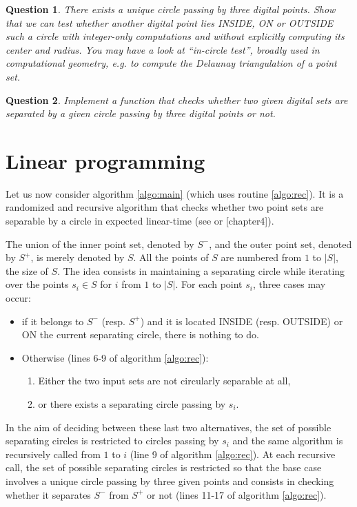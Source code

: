 \documentclass[a4paper, 11pt]{article}
\newtheorem{qu}{Question}
\begin{document}
\begin{qu}
There exists a unique circle passing by three digital points. Show that we can test whether another digital
point lies INSIDE, ON or OUTSIDE such a circle with integer-only computations and without explicitly computing 
its center and radius. You may have a look at ``in-circle test'', broadly used in computational geometry, e.g. 
to compute the Delaunay triangulation of a point set.  
\end{qu}

\begin{qu}
Implement a function that checks whether two given digital sets are separated by a given circle passing by three
digital points or not.  
\end{qu}

\section{Linear programming}

Let us now consider algorithm \ref{algo:main} (which uses routine \ref{algo:rec}). 
It is a randomized and recursive algorithm that checks whether two point sets
 are separable by a circle in expected linear-time (see \cite{Seidel1991} or \cite{Berg2000}[chapter4]). 

The union of the inner point set, denoted by $S^-$, and the outer point set, denoted by $S^+$, is 
merely denoted by $S$. All the points of $S$ are numbered from $1$ to $|S|$, the size of $S$.    
The idea consists in maintaining a separating circle while iterating over the points $s_i \in S$ 
for $i$ from $1$ to $|S|$. 
For each point $s_i$, three cases may occur:  
\begin{itemize}
 \item if it belongs to $S^-$ (resp. $S^+$) and it is located INSIDE (resp. OUTSIDE) or ON 
the current separating circle, there is nothing to do. 
 \item Otherwise (lines 6-9 of algorithm \ref{algo:rec}): 
 \begin{enumerate}
   \item Either the two input sets are not circularly separable at all,  
   \item or there exists a separating circle passing by $s_i$. 
 \end{enumerate}
\end{itemize}
In the aim of deciding between these last two alternatives, the set of possible separating 
circles is restricted to circles passing by $s_i$ and the same algorithm is recursively called
from $1$ to $i$ (line 9 of algorithm \ref{algo:rec}). 
At each recursive call, the set of possible separating circles is restricted so that the base case 
involves a unique circle passing by three given points and consists in checking whether it separates 
$S^-$ from $S^+$ or not (lines 11-17 of algorithm \ref{algo:rec}).  
\end{document}
